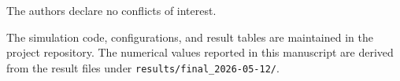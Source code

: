\documentclass[ASNA,twocolumn]{USG}
\begin{document}
\maketitle









The authors declare no conflicts of interest.

The simulation code, configurations, and result tables are maintained in the project repository. The numerical values reported in this manuscript are derived from the result files under \texttt{results/final\_2026-05-12/}.


\end{document}
